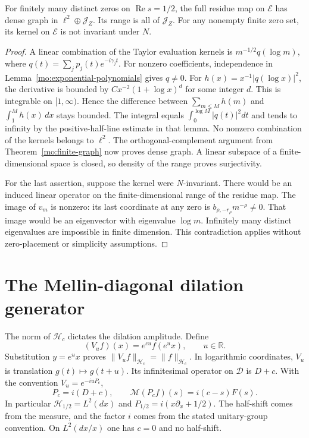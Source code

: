 \begin{proposition}
\label{mo:occupation-jet-graph}
For finitely many distinct zeros on $\operatorname{Re}s=1/2$,
the full residue map on $\mathscr E$ has dense graph in
$\ell^2\oplus\mathscr J_Z$. Its range is all of $\mathscr J_Z$.
For any nonempty finite zero set, its kernel on $\mathscr E$
is not invariant under $N$.
\end{proposition}
\begin{proof}
A linear combination of the Taylor evaluation kernels is
$m^{-1/2}q(\log m)$, where
$q(t)=\sum_jp_j(t)e^{-i\gamma_jt}$. For nonzero coefficients,
independence in Lemma~\ref{mo:exponential-polynomials} gives $q\ne0$.
For $h(x)=x^{-1}|q(\log x)|^2$, the derivative is bounded by
$Cx^{-2}(1+\log x)^d$ for some integer $d$.
This is integrable on $[1,\infty)$. Hence the difference between
$\sum_{m\leq M}h(m)$ and $\int_1^M h(x)\,dx$ stays bounded.
The integral equals $\int_0^{\log M}|q(t)|^2dt$ and tends to
infinity by the positive-half-line estimate in that lemma.
No nonzero combination of the kernels belongs to $\ell^2$.
The orthogonal-complement argument from Theorem~\ref{mo:finite-graph}
now proves dense graph. A linear subspace of a finite-dimensional
space is closed, so density of the range proves surjectivity.

For the last assertion, suppose the kernel were $N$-invariant.
There would be an induced linear operator on the finite-dimensional
range of the residue map. The image of $v_m$ is nonzero: its
last coordinate at any zero is
$b_{\rho,-r_\rho}m^{-\rho}\ne0$.
That image would be an eigenvector with eigenvalue $\log m$.
Infinitely many distinct eigenvalues are impossible in finite
dimension. This contradiction applies without zero-placement
or simplicity assumptions.
\end{proof}

\section{The Mellin-diagonal dilation generator}

The norm of $\mathscr H_c$ dictates the dilation amplitude. Define
\[
 (V_uf)(x)=e^{cu}f(e^u x),\qquad u\in\mathbb R.
\]
Substitution $y=e^u x$ proves $\|V_uf\|_{\mathscr H_c}=
\|f\|_{\mathscr H_c}$. In logarithmic coordinates, $V_u$ is
translation $g(t)\mapsto g(t+u)$. Its infinitesimal operator on
$\mathscr D$ is $D+c$. With the convention $V_u=e^{-iuP_c}$,
\begin{equation}
 P_c=i(D+c),\qquad
 \mathcal M(P_cf)(s)=i(c-s)F(s).
 \label{mo:dilation}
\end{equation}
In particular $\mathscr H_{1/2}=L^2(dx)$ and
$P_{1/2}=i(x\partial_x+1/2)$. The half-shift comes from the
measure, and the factor $i$ comes from the stated unitary-group
convention. On $L^2(dx/x)$ one has $c=0$ and no half-shift.

